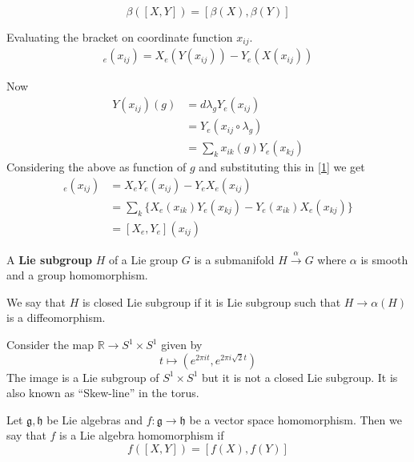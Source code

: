\documentclass[11pt,a4paper]{scrarticle}
\theoremstyle{definition}
\renewenvironment{proof}[1][\proofname]{\vspace{-10pt}\begin{myproof}}{\end{myproof}}
\theoremstyle{greenbox}
\newcommand{\R}{\mathbb{R}}
\begin{document}
    \begin{lemma}
        
        \[ \beta ([X,Y]) = [\beta(X),\beta(Y)] \]
        
    \end{lemma}
    \begin{proof}
        Evaluating the bracket on coordinate function $ x_{ij} $. \begin{align}
            [X,Y]_{e}(x_{ij}) = X_{e}(Y(x_{ij})) - Y_{e}(X(x_{ij})) \label{1}
        \end{align}

        Now \begin{align*}
            Y(x_{ij})(g) & = d \lambda_{g} Y_{e}(x_{ij}) \\
            & = Y_{e}(x_{ij} \circ \lambda_{g}) \\
            & = \sum_{k}^{} x_{ik}(g)Y_{e}(x_{kj}) 
        \end{align*}
        Considering the above as function of $ g $ and substituting this in \cref{1} we get \begin{align*}
            [X,Y]_{e}(x_{ij}) & = X_{e}Y_{e}(x_{ij}) - Y_{e}X_{e}(x_{ij}) \\
            & = \sum_{k} \{X_{e}(x_{ik})Y_{e}(x_{kj}) -  Y_{e}(x_{ik})X_{e}(x_{kj})\} \\
            & = [X_{e},Y_{e}](x_{ij})
        \end{align*}
    \end{proof}
    \begin{defn}
        A \textbf{Lie subgroup} $ H $ of a Lie group $ G $ is a submanifold $ H \xrightarrow{\alpha} G $ where $ \alpha $ is smooth and a group homomorphism. 
    \end{defn}
    We say that $ H $ is closed Lie subgroup if it is Lie subgroup such that $ H \to \alpha(H) $ is a diffeomorphism.
    \begin{example}
        Consider the map $ \R \to S^{1} \times S^{1} $ given by 
        \[ t \mapsto (e^{2 \pi it}, e^{2 \pi i \sqrt{2}t}) \]
        The image is a Lie subgroup of $ S^{1} \times S^{1} $ but it is not a closed Lie subgroup. It is also known as ``Skew-line'' in the torus. 
    \end{example}
    \begin{defn}
        Let $ \mathfrak{g}, \mathfrak{h} $ be Lie algebras and $ f: \mathfrak{g} \to \mathfrak{h} $ be a vector space homomorphism. Then we say that $ f $ is a Lie algebra homomorphism if 
    \[ f([X,Y]) = [f(X),f(Y)] \]
    \end{defn}
\end{document}

